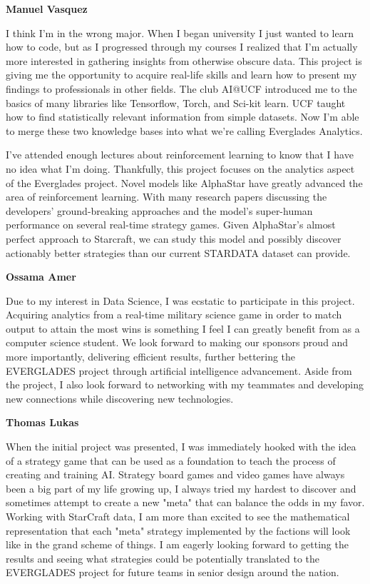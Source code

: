 \documentclass[a4paper,12pt]{report}
\newcommand{\msection}[1]{\noindent\textbf{#1}}
\begin{document}
\msection{Manuel Vasquez}

I think I’m in the wrong major. When I began university I just wanted to learn how to code, but as I progressed through my courses I realized that I’m actually more interested in gathering insights from otherwise obscure data. This project is giving me the opportunity to acquire real-life skills and learn how to present my findings to professionals in other fields. The club AI@UCF introduced me to the basics of many libraries like Tensorflow, Torch, and Sci-kit learn. UCF taught how to find statistically relevant information from simple datasets. Now I’m able to merge these two knowledge bases into what we’re calling Everglades Analytics.

I’ve attended enough lectures about reinforcement learning to know that I have no idea what I’m doing. Thankfully, this project focuses on the analytics aspect of the Everglades project. Novel models like AlphaStar have greatly advanced the area of reinforcement learning. With many research papers discussing the developers’ ground-breaking approaches and the model’s super-human performance on several real-time strategy games. Given AlphaStar’s almost perfect approach to Starcraft, we can study this model and possibly discover actionably better strategies than our current STARDATA dataset can provide.

\msection{Ossama Amer}

Due to my interest in Data Science, I was ecstatic to participate in this project. Acquiring analytics from a real-time military science game in order to match output to attain the most wins is something I feel I can greatly benefit from as a computer science student. We look forward to making our sponsors proud and more importantly, delivering efficient results, further bettering the EVERGLADES project through artificial intelligence advancement. Aside from the project, I also look forward to networking with my teammates and developing new connections while discovering new technologies.

\msection{Thomas Lukas}

When the initial project was presented, I was immediately hooked with the idea of a strategy game that can be used as a foundation to teach the process of creating and training AI. Strategy board games and video games have always been a big part of my life growing up, I always tried my hardest to discover and sometimes attempt to create a new "meta" that can balance the odds in my favor. Working with StarCraft data, I am more than excited to see the mathematical representation that each "meta" strategy implemented by the factions will look like in the grand scheme of things. I am eagerly looking forward to getting the results and seeing what strategies could be potentially translated to the EVERGLADES project for future teams in senior design around the nation.
\end{document}

